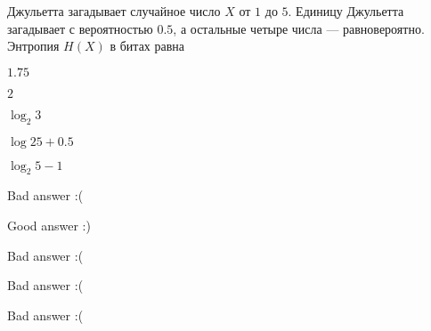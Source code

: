 
\begin{question}
Джульетта загадывает случайное число \(X\) от \(1\) до \(5\). Единицу
Джульетта загадывает с вероятностью \(0.5\), а остальные четыре числа
--- равновероятно. Энтропия \(H(X)\) в битах равна
\begin{answerlist}
  \item \(1.75\)
  \item \(2\)
  \item \(\log_2 3\)
  \item \(\log 2 5 + 0.5\)
  \item \(\log_2 5 - 1\)
\end{answerlist}
\end{question}

\begin{solution}
\begin{answerlist}
  \item Bad answer :(
  \item Good answer :)
  \item Bad answer :(
  \item Bad answer :(
  \item Bad answer :(
\end{answerlist}
\end{solution}

